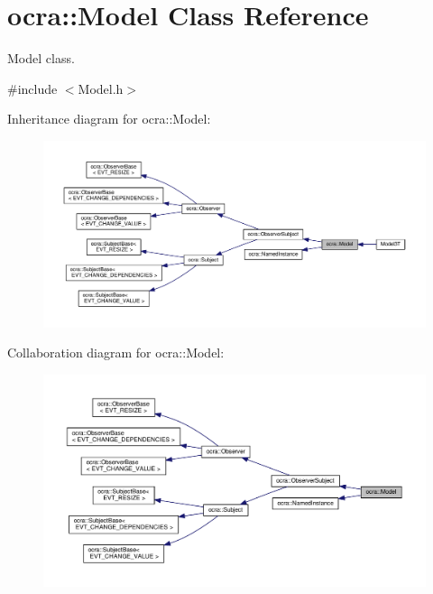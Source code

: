 \hypertarget{classocra_1_1Model}{}\section{ocra\+:\+:Model Class Reference}
\label{classocra_1_1Model}


Model class.  




{\ttfamily \#include $<$Model.\+h$>$}



Inheritance diagram for ocra\+:\+:Model\+:
\nopagebreak
\begin{figure}[H]
\begin{center}
\leavevmode
\includegraphics[width=350pt]{dd/d5d/classocra_1_1Model__inherit__graph}
\end{center}
\end{figure}


Collaboration diagram for ocra\+:\+:Model\+:
\nopagebreak
\begin{figure}[H]
\begin{center}
\leavevmode
\includegraphics[width=350pt]{d1/d18/classocra_1_1Model__coll__graph}
\end{center}
\end{figure}
